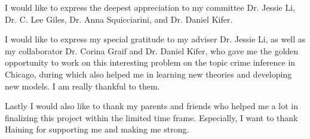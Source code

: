 

I would like to express the deepest appreciation to my committee Dr. Jessie Li, Dr. C. Lee Giles, Dr. Anna Squicciarini, and Dr. Daniel Kifer. 

I would like to express my special gratitude to my adviser Dr. Jessie Li, as well as my collaborator Dr. Corina Graif and Dr. Daniel Kifer, who gave me the golden opportunity to work on this interesting problem on the topic crime inference in Chicago, during which also helped me in learning new theories and developing new models. I am really thankful to them.

Lastly I would also like to thank my parents and friends who helped me a lot in finalizing this project within the limited time frame. Especially, I want to thank Haining for supporting me and making me strong.